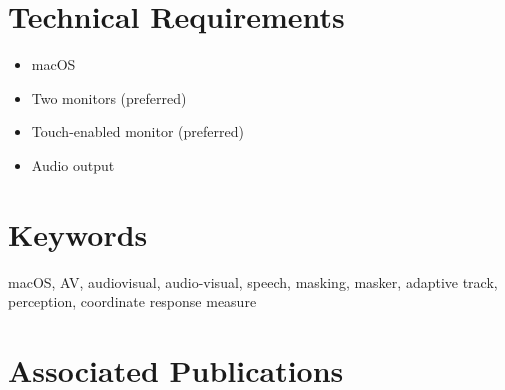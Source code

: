 \documentclass[11pt,pdftex,letterpaper]{article}
\begin{document}
\section{Technical Requirements}
\begin{itemize}
\item macOS
\item Two monitors (preferred)
\item Touch-enabled monitor (preferred)
\item Audio output
\end{itemize}

\section{Keywords}
macOS, AV, audiovisual, audio-visual, speech, masking, masker, adaptive track, perception, coordinate response measure

\section{Associated Publications}
\end{document}
